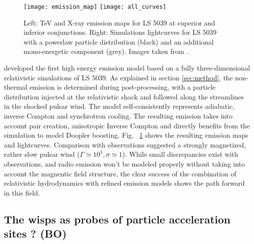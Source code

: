 \begin{figure}[h]
  \centering
  \texttt{[image: emission\_map]}
  \texttt{[image: all\_curves]}
  \caption{Left: TeV and X-ray emission maps for LS 5039 at superior and inferior conjunctions. Right: Simulations lightcurves for LS 5039 with a powerlaw particle distribution (black) and an additional mono-energetic component (grey). Images taken from \cite{2015A&A...581A..27D}.}
  \label{fig:LS5039}
\end{figure}

\citet{2015A&A...581A..27D} developed the first high energy emission model based on a fully three-dimensional relativistic simulations of LS 5039.  As explained in section \ref{sec:method}, the non-thermal emission is determined during post-processing, with a particle distribution injected at the relativistic shock and followed along the streamlines in the shocked pulsar wind. The model self-consistently represents adiabatic, inverse Compton and synchrotron cooling. The resulting emission takes into account pair creation, anisotropic Inverse Compton and directly benefits from the simulation to model Doopler boosting.  Fig. ~\ref{fig:LS5039} shows the resulting emission maps and lightcurves.  Comparison with observations suggested a strongly magnetized, rather slow pulsar wind ($\Gamma\simeq 10^3, \sigma \simeq 1$). While small discrepancies exist with observations, and radio emission won't be modeled properly without taking into account the magnentic field structure, the clear success of the combination of relativistic hydrodynamics with refined emission models shows the path forward in this field.



\subsection{The wisps as probes of  particle acceleration sites ? (BO)}

